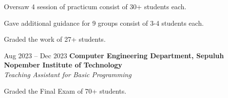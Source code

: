     \vspace{0.10 cm}
    \begin{onecolentry}
        \begin{highlights}
            \item Oversaw 4 session of practicum consist of 30+ students each.
            \item Gave additional guidance for 9 groups consist of 3-4 students each.
            \item Graded the work of 27+ students.
        \end{highlights}
    \end{onecolentry}

    \vspace{0.2 cm}

    \begin{twocolentry}{
        Aug 2023 – Dec 2023
    }
    \textbf{Computer Engineering Department, Sepuluh Nopember Institute of Technology}\\
    \textit{Teaching Assistant for Basic Programming}
    \end{twocolentry}

    \vspace{0.10 cm}

    \begin{onecolentry}
        \begin{highlights}
        \item Graded the Final Exam of 70+ students.
        \end{highlights}
    \end{onecolentry}
